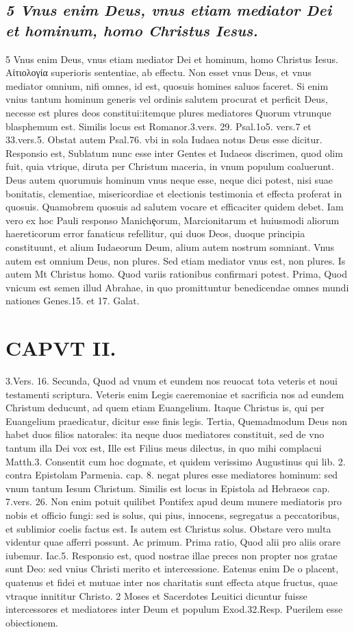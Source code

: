 \documentclass{article}
\begin{document}
\begin{pages}
\subsection*{\textit{5 Vnus enim Deus, vnus etiam mediator Dei et hominum, homo Christus Iesus.}}5 Vnus enim Deus, vnus etiam mediator Dei et hominum, homo Christus Iesus. Αἰτιολογία superioris sententiae, ab effectu. Non esset vnus Deus, et vnus mediator omnium, nifi omnes, id est, quosuis homines saluos faceret. Si enim vnius tantum hominum generis vel ordinis salutem procurat et perficit Deus, necesse est plures deos constitui:itemque plures mediatores Quorum vtrunque blasphemum est. Similis locus est Romanor.3.vers. 29. Psal.1o5. vers.7 et 33.vers.5. Obstat autem Psal.76. vbi in sola Iudaea notus Deus esse dicitur. Responsio est, Sublatum nunc esse inter Gentes et Iudaeos discrimen, quod olim fuit, quia vtrique, diruta per Christum maceria, in vnum populum coaluerunt. Deus autem quorumuis hominum vnus neque esse, neque dici potest, nisi suae bonitatis, clementiae, misericordiae et electionis testimonia et effecta proferat in quosuis. Quamobrem quosuis ad salutem vocare et efficaciter quidem debet. Iam vero ex hoc Pauli responso Manichȩorum, Marcionitarum et huiusmodi aliorum haereticorum error fanaticus refellitur, qui duos Deos, duoque principia constituunt, et alium Iudaeorum Deum, alium autem nostrum somniant. Vnus autem est omnium Deus, non plures. Sed etiam mediator vnus est, non plures. Is autem Mt Christus homo. Quod variis rationibus confirmari potest. Prima, Quod vnicum est semen illud Abrahae, in quo promittuntur benedicendae omnes mundi nationes Genes.15. et 17. Galat.  \pend
\section*{CAPVT  II. }
\marginpar{[ p.57 ]}\pstart 3.Vers. 16. Secunda, Quod ad vnum et eundem nos reuocat tota veteris et noui testamenti scriptura. Veteris enim Legis caeremoniae et sacrificia nos ad eundem Christum deducunt, ad quem etiam Euangelium. Itaque Christus is, qui per Euangelium praedicatur, dicitur esse finis legis. Tertia, Quemadmodum Deus non habet duos filios natorales: ita neque duos mediatores constituit, sed de vno tantum illa Dei vox est, Ille est Filius meus dilectus, in quo mihi complacui Matth.3. Consentit cum hoc dogmate, et quidem verissimo Augustinus qui lib. 2. contra Epistolam Parmenia. cap. 8. negat plures esse mediatores hominum: sed vnum tantum Iesum Christum. Similis est locus in Epistola ad Hebraeos cap. 7.vers. 26. Non enim potuit quilibet Pontifex apud deum munere mediatoris pro nobis et officio fungi: sed is solus, qui pius, innocens, segregatus a peccatoribus, et sublimior coelis factus est. Is autem est Christus solus. Obstare vero multa videntur quae afferri possunt. Ac primum. Prima ratio, Quod alii pro aliis orare iubemur. Iac.5. Responsio est, quod nostrae illae preces non propter nos gratae sunt Deo: sed vnius Christi merito et intercessione. Eatenus enim De o placent, quatenus et fidei et mutuae inter nos charitatis sunt effecta atque fructus, quae vtraque innititur Christo. 2 Moses et Sacerdotes Leuitici dicuntur fuisse intercessores et mediatores inter Deum et populum Exod.32.Resp. Puerilem esse obiectionem.  \pend

\end{pages}
\end{document}
